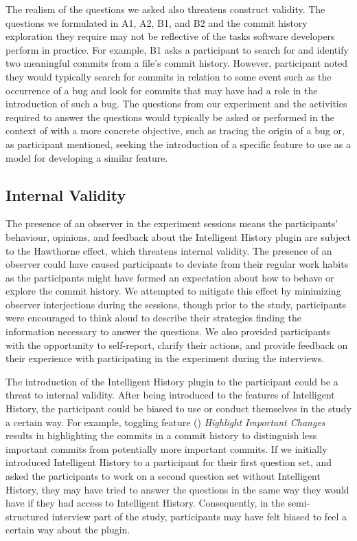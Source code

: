 The realism of the questions we asked also threatens construct validity.
The questions we formulated in A1, A2, B1, and B2 and the commit history exploration 
they require may not be reflective of the tasks software developers perform in practice.
For example, B1 asks a participant to search for and identify two meaningful commits from a 
file's commit history. However, participant  noted they would typically
search for commits in relation to some event such as the occurrence of a bug and look
for commits that may have had a role in the introduction of such a bug.
The questions from our experiment and the activities required to answer the questions would typically be
asked or performed in the context of  with a more concrete objective, 
such as tracing the origin of a bug or, as participant  mentioned, 
seeking the introduction of a specific feature to use as a model for developing a similar feature.

\subsection{Internal Validity}

The presence of an observer in the experiment sessions means the participants' behaviour, opinions, 
and feedback about the Intelligent History plugin are subject to the Hawthorne effect,
which threatens internal validity.
The presence of an observer could have caused participants to deviate from their regular work habits 
as the participants might have formed an expectation about how to behave or explore the commit history.
We attempted to mitigate this effect by minimizing observer interjections during the sessions, 
though prior to the study, participants were encouraged to think aloud to describe their strategies 
 finding the information necessary to answer the questions.
We also provided participants with the opportunity to self-report, clarify their actions, 
and provide feedback on their experience with participating in the experiment during the interviews.

The introduction of the Intelligent History plugin to the participant could be a threat to internal validity.
After being introduced to the features of Intelligent History, 
the participant could be biased to use or conduct themselves in the study a certain way.
For example, toggling feature () \textit{Highlight Important Changes} 
results in highlighting the commits in a commit history to distinguish less important commits from potentially more important commits.
If we initially introduced Intelligent History to a participant for their first question set,
and asked the participants to work on a second question set without Intelligent History,
they may have tried to answer the questions in the same way they would have if they had access to Intelligent History.
Consequently, in the semi-structured interview part of the study, 
participants may have felt biased to feel a certain way about the plugin.

